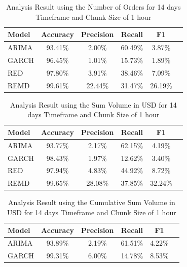 \documentclass[12pt]{article}
\begin{document}
	\begin{table}[!ht]
        \centering
        \caption{Analysis Result using the Number of Orders for 14 days Timeframe and Chunk Size of 1 hour}
        \begin{tabular}{lccccc}
            \toprule
            \textbf{Model} & \textbf{Accuracy} & \textbf{Precision} & \textbf{Recall} & \textbf{F1} \\
            \midrule
            ARIMA & 93.41\% & 2.00\% & 60.49\% & 3.87\% \\
			GARCH & 96.45\% & 1.01\% & 15.73\% & 1.89\% \\
			RED & 97.80\% & 3.91\% & 38.46\% & 7.09\% \\
			REMD & 99.61\% & 22.44\% & 31.47\% & 26.19\% \\
            \bottomrule
        \end{tabular}
        \label{tab_full_series_3600_orders}
    \end{table}

	\begin{table}[!ht]
        \centering
        \caption{Analysis Result using the Sum Volume in USD for 14 days Timeframe and Chunk Size of 1 hour}
        \begin{tabular}{lccccc}
            \toprule
            \textbf{Model} & \textbf{Accuracy} & \textbf{Precision} & \textbf{Recall} & \textbf{F1} \\
            \midrule
            ARIMA & 93.77\% & 2.17\% & 62.15\% & 4.19\% \\
			GARCH & 98.43\% & 1.97\% & 12.62\% & 3.40\% \\
			RED & 97.94\% & 4.83\% & 44.92\% & 8.72\% \\
			REMD & 99.65\% & 28.08\% & 37.85\% & 32.24\% \\
            \bottomrule
        \end{tabular}
        \label{tab_full_series_3600_volume}
    \end{table}

	\begin{table}[!ht]
        \centering
        \caption{Analysis Result using the Cumulative Sum Volume in USD for 14 days Timeframe and Chunk Size of 1 hour}
        \begin{tabular}{lccccc}
            \toprule
            \textbf{Model} & \textbf{Accuracy} & \textbf{Precision} & \textbf{Recall} & \textbf{F1} \\
            \midrule
            ARIMA & 93.89\% & 2.19\% & 61.51\% & 4.22\% \\
 			GARCH & 99.31\% & 6.00\% & 14.78\% & 8.53\% \\
            \bottomrule
        \end{tabular}
        \label{tab_full_series_3600_volume_cusum}
    \end{table}
\end{document}
